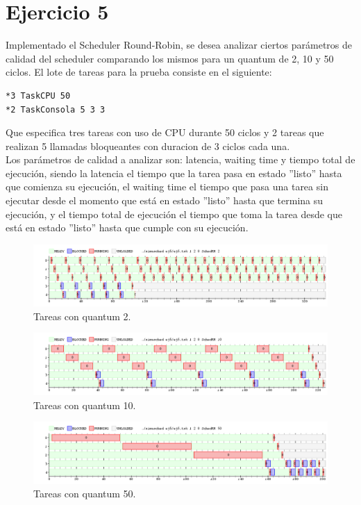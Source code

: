 \section{Ejercicio 5}

Implementado el Scheduler Round-Robin, se desea analizar ciertos parámetros de calidad del scheduler comparando los mismos para un quantum de 2, 10 y 50 ciclos.
El lote de tareas para la prueba consiste en el siguiente:

\begin{verbatim}
*3 TaskCPU 50 
*2 TaskConsola 5 3 3
\end{verbatim}

Que especifica tres tareas con uso de CPU durante 50 ciclos y 2 tareas que realizan 5 llamadas bloqueantes con duracion de 3 ciclos cada una.\\

Los parámetros de calidad a analizar son: latencia, waiting time y tiempo total de ejecución, siendo la latencia el tiempo que la tarea pasa en estado ''listo'' hasta que comienza su ejecución, el waiting time el tiempo que pasa una tarea sin ejecutar desde el momento que está en estado ''listo'' hasta que termina su ejecución, y el tiempo total de ejecución el tiempo que toma la tarea desde que está en estado ''listo'' hasta que cumple con su ejecución.

\begin{figure}[h]
  \includegraphics[width=\textwidth]{../ej5/ej5RR1202.png}
  \caption{Tareas con quantum 2.}
  \label{fig:quant2}
\end{figure}


\begin{figure}[h]
  \includegraphics[width=\textwidth]{../ej5/ej5RR12010.png}
  \caption{Tareas con quantum 10.}
  \label{fig:quant10}
\end{figure}


\begin{figure}[h]
  \includegraphics[width=\textwidth]{../ej5/ej5RR12050.png}
  \caption{Tareas con quantum 50.}
  \label{fig:quant50}
\end{figure}


